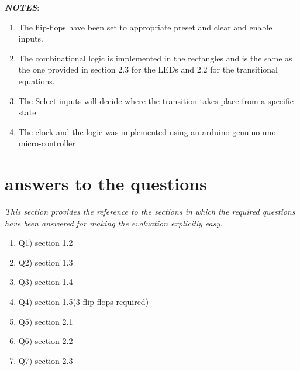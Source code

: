 \documentclass[12pt,a4paper]{report}
\begin{document}
\textit{\textbf{NOTES}}:
\begin{enumerate}
\item The flip-flops have been set to appropriate preset and clear and enable inputs.
\item The combinational logic is implemented in the rectangles and is the same as the one provided in section 2.3 for the LEDs and 2.2 for the transitional equations.
\item The Select inputs will decide where the transition takes place from a specific state.
\item The clock and the logic was implemented using an arduino genuino uno micro-controller 

\end{enumerate}

\clearpage 

\section{answers to the questions}

\textit{This section provides the reference to the sections in which the required questions have been answered for making the evaluation explicitly easy.}

\begin{enumerate}
    \item Q1)  section 1.2
    \item Q2)  section 1.3
    \item Q3)  section 1.4
    \item Q4)  section 1.5(3 flip-flops required)
    \item Q5)  section 2.1
    \item Q6)  section 2.2 
    \item Q7)  section 2.3
\end{enumerate}
\end{document}
